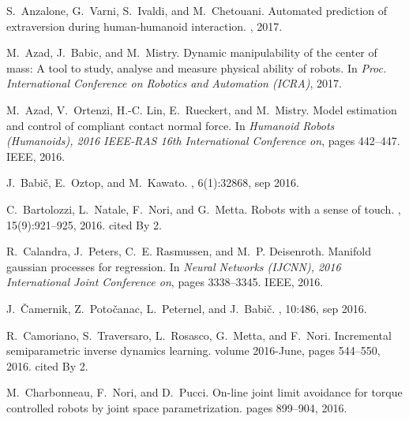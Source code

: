 \documentclass[12pt,a4paper,twoside]{article}
\begin{document}
\renewcommand{\section}[2]{}%
\begin{thebibliography}{}
S.~Anzalone, G.~Varni, S.~Ivaldi, and M.~Chetouani.
\newblock Automated prediction of extraversion during human-humanoid
  interaction.
, 2017.

M.~Azad, J.~Babic, and M.~Mistry.
\newblock Dynamic manipulability of the center of mass: A tool to study,
  analyse and measure physical ability of robots.
\newblock In {\em Proc. International Conference on Robotics and Automation
  (ICRA)}, 2017.

M.~Azad, V.~Ortenzi, H.-C. Lin, E.~Rueckert, and M.~Mistry.
\newblock Model estimation and control of compliant contact normal force.
\newblock In {\em Humanoid Robots (Humanoids), 2016 IEEE-RAS 16th International
  Conference on}, pages 442--447. IEEE, 2016.

J.~Babi{\v{c}}, E.~Oztop, and M.~Kawato.
, 6(1):32868, sep 2016.

C.~Bartolozzi, L.~Natale, F.~Nori, and G.~Metta.
\newblock Robots with a sense of touch.
, 15(9):921--925, 2016.
\newblock cited By 2.

R.~Calandra, J.~Peters, C.~E. Rasmussen, and M.~P. Deisenroth.
\newblock Manifold gaussian processes for regression.
\newblock In {\em Neural Networks (IJCNN), 2016 International Joint Conference
  on}, pages 3338--3345. IEEE, 2016.

J.~{\v{C}}amernik, Z.~Poto{\v{c}}anac, L.~Peternel, and J.~Babi{\v{c}}.
, 10:486, sep 2016.

R.~Camoriano, S.~Traversaro, L.~Rosasco, G.~Metta, and F.~Nori.
\newblock Incremental semiparametric inverse dynamics learning.
\newblock volume 2016-June, pages 544--550, 2016.
\newblock cited By 2.

M.~Charbonneau, F.~Nori, and D.~Pucci.
\newblock On-line joint limit avoidance for torque controlled robots by joint
  space parametrization.
\newblock pages 899--904, 2016.
 


\end{thebibliography}
\end{document}
